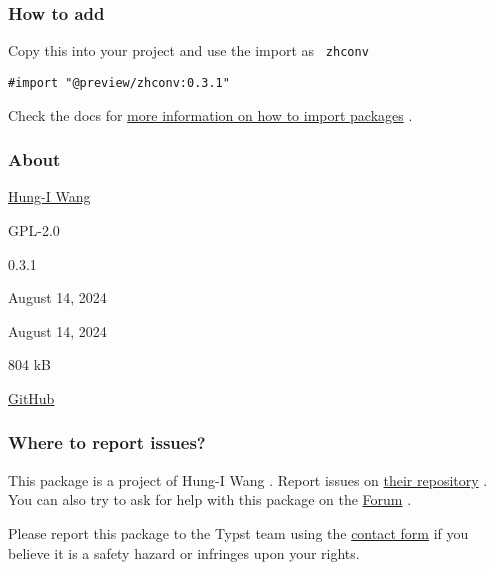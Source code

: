 \subsubsection{How to add}\label{how-to-add}

Copy this into your project and use the import as \texttt{\ zhconv\ }

\begin{verbatim}
#import "@preview/zhconv:0.3.1"
\end{verbatim}



Check the docs for
\href{https://typst.app/docs/reference/scripting/\#packages}{more
information on how to import packages} .

\subsubsection{About}\label{about}

\begin{description}
\tightlist
\item[Author :]
\href{mailto:whygowe@gmail.com}{Hung-I Wang}
\item[License:]
GPL-2.0
\item[Current version:]
0.3.1
\item[Last updated:]
August 14, 2024
\item[First released:]
August 14, 2024
\item[Archive size:]
804 kB
\href{https://packages.typst.org/preview/zhconv-0.3.1.tar.gz}{\pandocbounded{}}
\item[Repository:]
\href{https://github.com/Gowee/zhconv-rs}{GitHub}
\end{description}

\subsubsection{Where to report issues?}\label{where-to-report-issues}

This package is a project of Hung-I Wang . Report issues on
\href{https://github.com/Gowee/zhconv-rs}{their repository} . You can
also try to ask for help with this package on the
\href{https://forum.typst.app}{Forum} .

Please report this package to the Typst team using the
\href{https://typst.app/contact}{contact form} if you believe it is a
safety hazard or infringes upon your rights.

